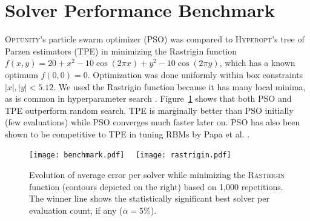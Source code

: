\section{Solver Performance Benchmark}
\textsc{Optunity}'s particle swarm optimizer (PSO) was compared to \textsc{Hyperopt}'s tree of Parzen estimators (TPE) in minimizing the Rastrigin function $f(x, y) = 20 + x^2 - 10 \cos(2\pi x) + y^2 - 10 \cos(2\pi y)$, which has a known optimum $f(0,0)=0$.
Optimization was done uniformly within box constraints $|x|, |y| < 5.12$. We used the Rastrigin function because it has many local minima, as is common in hyperparameter search \citep{claesen2015hyperparameter}. Figure~\ref{fig:benchmark} shows that both PSO and TPE outperform random search. TPE is marginally better than PSO initially (few evaluations) while PSO converges much faster later on. PSO has also been shown to be competitive to TPE in tuning RBMs by Papa et al. \citep{papa2015model}.

\begin{figure}[!h]
  \centering 
      \texttt{[image: benchmark.pdf]} \ \ 
      \texttt{[image: rastrigin.pdf]}\vfill
  \caption{Evolution of average error per solver while minimizing the \textsc{Rastrigin} function (contours depicted on the right) based on 1,000 repetitions. The winner line shows the statistically significant best solver per evaluation count, if any ($\alpha=5\%$).}\label{fig:benchmark}
\vspace{-3em}
\end{figure}

\cleardoublepage

